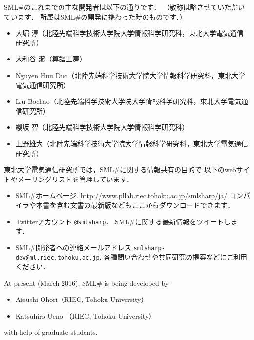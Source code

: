 \documentclass{jbook}
\newcommand{\smlsharp}{SML\#}
\begin{document}
	\smlsharp{}のこれまでの主な開発者は以下の通りです．
	（敬称は略させていただいています．
	所属は\smlsharp{}の開発に携わった時のものです．）
\begin{itemize}
\item 大堀 淳（北陸先端科学技術大学院大学情報科学研究科，東北大学電気通信研究所）
\item 大和谷 潔（算譜工房）
\item Nguyen Huu Duc（北陸先端科学技術大学院大学情報科学研究科，東北大学電気通信研究所）
\item Liu Bochao（北陸先端科学技術大学院大学情報科学研究科，東北大学電気通信研究所）
\item 纓坂 智（北陸先端科学技術大学院大学情報科学研究科）
\item 上野雄大（北陸先端科学技術大学院大学情報科学研究科，東北大学電気通信研究所）
\end{itemize}

	東北大学電気通信研究所では，\smlsharp{}に関する情報共有の目的で
以下のwebサイトやメーリングリストを管理しています．
\begin{itemize}
\item \smlsharp{}ホームページ.
\url{http://www.pllab.riec.tohoku.ac.jp/smlsharp/ja/}
コンパイラや本書を含む文書の最新版などもここからダウンロードできます．


\item Twitterアカウント {\tt @smlsharp}．
\smlsharp{}に関する最新情報をツイートします．


\item \smlsharp{}開発者への連絡メールアドレス
{\tt smlsharp-dev@ml.riec.tohoku.ac.jp}.
各種問い合わせや共同研究の提案などにご利用ください．

\end{itemize}
\else%
	At present (March 2016), \smlsharp{} is being developed by
\begin{itemize}
\item 
Atsushi Ohori（RIEC, Tohoku University）
\item 
Katsuhiro Ueno （RIEC, Tohoku University）
\end{itemize}
with help of graduate students.
\end{document}

